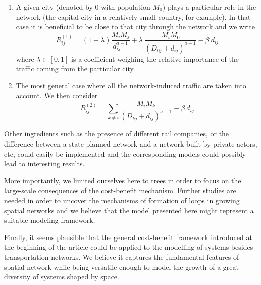 \begin{enumerate}
    \item A given city (denoted by $0$ with population $M_0$) plays a particular role in the network (the capital city in a relatively small country, for example). In that case it is beneficial to be close to that city through the network and we write
    \begin{equation}
        \label{eq:R1}
        R^{(1)}_{ij} = (1-\lambda)\frac{M_i M_j}{d_{ij}^{a-1}}  + \lambda \: \frac{M_i M_0}{\left(D_{0j} + d_{ij}\right)^{a-1}}- \beta \: d_{ij}
    \end{equation}
    where $\lambda \in \left[ 0,1 \right]$ is a coefficient weighing the relative importance of the traffic coming from the particular city.

    \item The most general case where all the network-induced traffic are taken into account. We then consider
    \begin{equation}
        \label{eq:R2}
        R^{(2)}_{ij} = \sum_{k \neq i}\frac{M_i M_k}{\left(D_{kj} + d_{ij}\right)^{a-1}}- \beta \: d_{ij}
    \end{equation}
\end{enumerate} 

Other ingredients such as the presence of different rail companies, or the
difference between a state-planned network and a network built by private
actors, etc, could easily be implemented and the corresponding models could
possibly lead to interesting results.

More importantly, we limited ourselves here to trees in order to focus on the
large-scale consequences of the cost-benefit mechanism. Further studies are
needed in order to uncover the mechanisms of formation of loops in growing
spatial networks and we believe that the model presented here might represent a
suitable modeling framework.

Finally, it seems plausible that the general cost-benefit framework introduced
at the beginning of the article could be applied to the modelling of systems
besides transportation networks. We believe it captures the fundamental features
of spatial network while being versatile enough to model the growth of a great
diversity of systems shaped by space.
